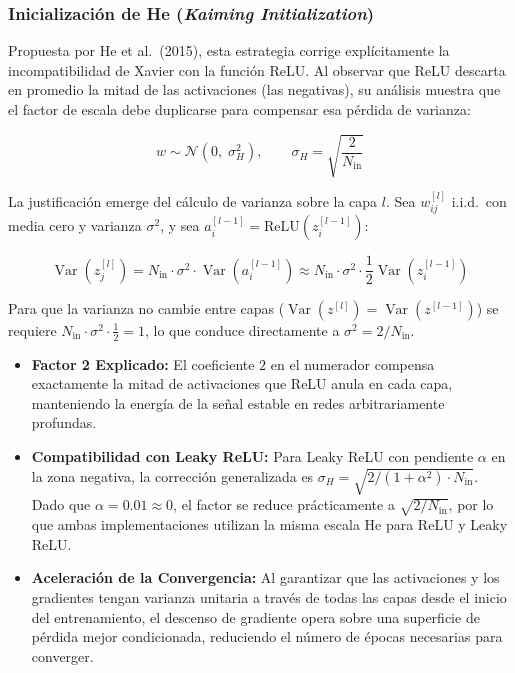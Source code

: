 \subsubsection{Inicialización de He (\textit{Kaiming Initialization})}

Propuesta por He et al.\ (2015), esta estrategia corrige explícitamente la incompatibilidad de Xavier con la función ReLU. Al observar que ReLU descarta en promedio la mitad de las activaciones (las negativas), su análisis muestra que el factor de escala debe duplicarse para compensar esa pérdida de varianza:

\begin{equation}
    w \sim \mathcal{N}\!\left(0,\;\sigma^2_H\right), \qquad \sigma_H = \sqrt{\frac{2}{N_{\text{in}}}}
\end{equation}

La justificación emerge del cálculo de varianza sobre la capa $l$. Sea $w_{ij}^{[l]}$ i.i.d.\ con media cero y varianza $\sigma^2$, y sea $a_i^{[l-1]} = \text{ReLU}(z_i^{[l-1]})$:

\begin{equation}
    \operatorname{Var}\!\left(z_j^{[l]}\right)
    = N_{\text{in}} \cdot \sigma^2 \cdot \operatorname{Var}\!\left(a_i^{[l-1]}\right)
    \approx N_{\text{in}} \cdot \sigma^2 \cdot \frac{1}{2}\operatorname{Var}\!\left(z_i^{[l-1]}\right)
\end{equation}

Para que la varianza no cambie entre capas ($\operatorname{Var}(z^{[l]}) = \operatorname{Var}(z^{[l-1]})$) se requiere $N_{\text{in}} \cdot \sigma^2 \cdot \tfrac{1}{2} = 1$, lo que conduce directamente a $\sigma^2 = 2/N_{\text{in}}$.

\begin{itemize}
    \item \textbf{Factor 2 Explicado:} El coeficiente $2$ en el numerador compensa exactamente la mitad de activaciones que ReLU anula en cada capa, manteniendo la energía de la señal estable en redes arbitrariamente profundas.
    \item \textbf{Compatibilidad con Leaky ReLU:} Para Leaky ReLU con pendiente $\alpha$ en la zona negativa, la corrección generalizada es $\sigma_H = \sqrt{2/(1+\alpha^2) \cdot N_{\text{in}}}$. Dado que $\alpha = 0.01 \approx 0$, el factor se reduce prácticamente a $\sqrt{2/N_{\text{in}}}$, por lo que ambas implementaciones utilizan la misma escala He para ReLU y Leaky ReLU.
    \item \textbf{Aceleración de la Convergencia:} Al garantizar que las activaciones y los gradientes tengan varianza unitaria a través de todas las capas desde el inicio del entrenamiento, el descenso de gradiente opera sobre una superficie de pérdida mejor condicionada, reduciendo el número de épocas necesarias para converger.
\end{itemize}


